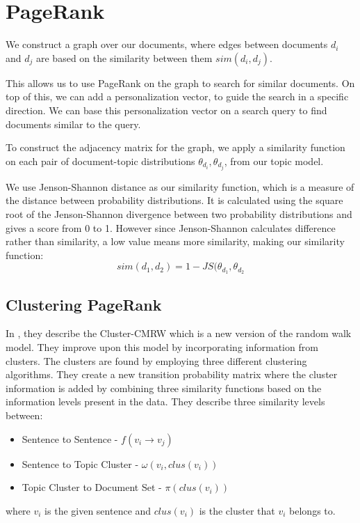 \section{PageRank}\label{sec:pagerank}
We construct a graph over our documents, where edges between documents $d_i$ and $d_j$ are based on the similarity between them $sim(d_i, d_j)$.

This allows us to use PageRank on the graph to search for similar documents.
On top of this, we can add a personalization vector, to guide the search in a specific direction.
We can base this personalization vector on a search query to find documents similar to the query.

To construct the adjacency matrix for the graph, we apply a similarity function on each pair of document-topic distributions $\theta_{d_i}, \theta_{d_j}$, from our topic model.

We use Jenson-Shannon distance as our similarity function, which is a measure of the distance between probability distributions\cite{jensen-shannon2003}\cite{jensen-shannondis2003}.
It is calculated using the square root of the Jenson-Shannon divergence between two probability distributions and gives a score from 0 to 1.
However since Jenson-Shannon calculates difference rather than similarity, a low value means more similarity, making our similarity function:
$$sim(d_1, d_2) = 1 - JS(\theta_{d_1}, \theta_{d_2}$$


\subsection{Clustering PageRank}

In \cite{ClusterPageRank}, they describe the \gls{Cluster-CMRW} which is a new version of the random walk model. 
They improve upon this model by incorporating information from clusters. 
The clusters are found by employing three different clustering algorithms.
They create a new transition probability matrix where the cluster information is added by combining three similarity functions based on the information levels present in the data.
They describe three similarity levels between:
\begin{itemize}
    \item Sentence to Sentence - $f(v_i \rightarrow v_j)$
    \item Sentence to Topic Cluster - $\omega(v_i, clus(v_i))$
    \item Topic Cluster to Document Set - $\pi(clus(v_i))$
\end{itemize}
where $v_i$ is the given sentence and $clus(v_i)$ is the cluster that $v_i$ belongs to.

